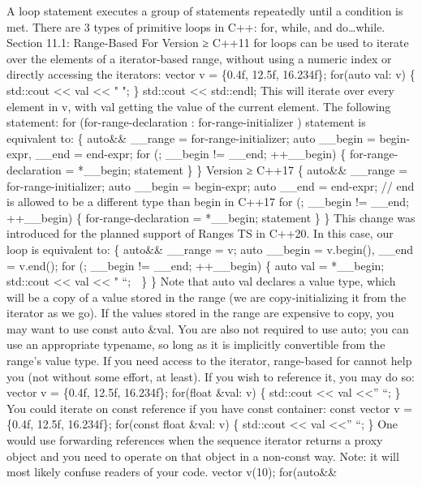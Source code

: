 A loop statement executes a group of statements repeatedly until a
condition is met. There are 3 types of primitive loops in C++: for,
while, and do\ldots while. Section 11.1: Range-Based For Version ≥ C++11
for loops can be used to iterate over the elements of a iterator-based
range, without using a numeric index or directly accessing the
iterators: vector v = \{0.4f, 12.5f, 16.234f\}; for(auto val: v) \{
std::cout \textless\textless{} val \textless\textless{} " "; \}
std::cout \textless\textless{} std::endl; This will iterate over every
element in v, with val getting the value of the current element. The
following statement: for (for-range-declaration : for-range-initializer
) statement is equivalent to: \{ auto\&\& \_\_range =
for-range-initializer; auto \_\_begin = begin-expr, \_\_end = end-expr;
for (; \_\_begin != \_\_end; ++\_\_begin) \{ for-range-declaration =
*\_\_begin; statement \} \} Version ≥ C++17 \{ auto\&\& \_\_range =
for-range-initializer; auto \_\_begin = begin-expr; auto \_\_end =
end-expr; // end is allowed to be a different type than begin in C++17
for (; \_\_begin != \_\_end; ++\_\_begin) \{ for-range-declaration =
*\_\_begin; statement \} \} This change was introduced for the planned
support of Ranges TS in C++20. In this case, our loop is equivalent to:
\{ auto\&\& \_\_range = v; auto \_\_begin = v.begin(), \_\_end =
v.end(); for (; \_\_begin != \_\_end; ++\_\_begin) \{ auto val =
*\_\_begin; std::cout \textless\textless{} val \textless\textless{} "
``;  \} \} Note that auto val declares a value type, which will be a
copy of a value stored in the range (we are copy-initializing it from
the iterator as we go). If the values stored in the range are expensive
to copy, you may want to use const auto \&val. You are also not required
to use auto; you can use an appropriate typename, so long as it is
implicitly convertible from the range's value type. If you need access
to the iterator, range-based for cannot help you (not without some
eﬀort, at least). If you wish to reference it, you may do so: vector v =
\{0.4f, 12.5f, 16.234f\}; for(float \&val: v) \{ std::cout
\textless\textless{} val \textless\textless{}'' ``; \} You could iterate
on const reference if you have const container: const vector v = \{0.4f,
12.5f, 16.234f\}; for(const float \&val: v) \{ std::cout
\textless\textless{} val \textless\textless{}'' ``; \} One would use
forwarding references when the sequence iterator returns a proxy object
and you need to operate on that object in a non-const way. Note: it will
most likely confuse readers of your code. vector v(10); for(auto\&\&
